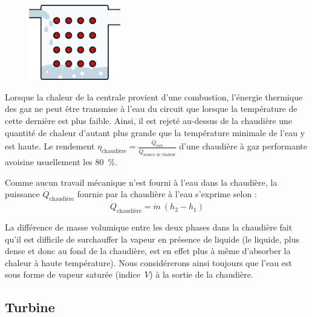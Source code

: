 		\begin{figure}
			\begin{center}
				\includegraphics[width=4cm]{images/symbole_chaudiere.png}
			\end{center}
			\label{fig_centrale_chaudiere2}
		\end{figure}
		
		Lorsque la chaleur de la centrale provient d’une combustion, l’énergie thermique des gaz ne peut être transmise à l’eau du circuit que lorsque la température de cette dernière est plus faible. Ainsi, il est rejeté au-dessus de la chaudière une quantité de chaleur d’autant plus grande que la température minimale de l’eau y est haute. Le rendement $\eta_\text{chaudière} = \frac{\dot Q_\text{eau}}{\dot Q_\text{source de chaleur}}$ d’une chaudière à gaz performante avoisine usuellement les \SI{80}{\percent}.

		Comme aucun travail mécanique n’est fourni à l’eau dans la chaudière, la puissance $\dot{Q}_\text{chaudière}$ fournie par la chaudière à l’eau s’exprime selon :
		\begin{equation}
			\dot{Q}_\text{chaudière} = \dot{m} \ (h_2 - h_1)
		\end{equation}

		La différence de masse volumique entre les deux phases dans la chaudière fait qu’il est difficile de surchauffer la vapeur en présence de liquide (le liquide, plus dense et donc au fond de la chaudière, est en effet plus à même d’absorber la chaleur à haute température). Nous considérerons ainsi toujours que l’eau est sous forme de vapeur saturée (indice~$V$) à la sortie de la chaudière.
		
	\dontbreakpage%

	\subsection{Turbine}


